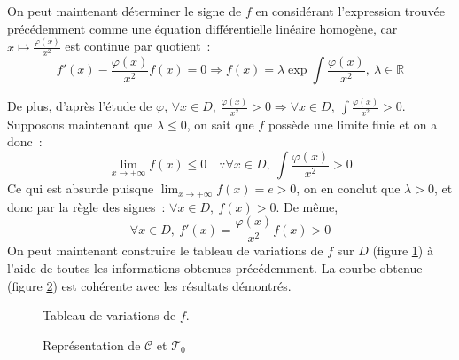 \documentclass{article}
\begin{document}
    On peut maintenant déterminer le signe de $f$ en considérant l'expression trouvée précédemment comme une équation différentielle linéaire homogène, car $x\mapsto\frac{\varphi(x)}{x^2}$ est continue par quotient~:
    \begin{displaymath}
      f'(x) - \frac{\varphi(x)}{x^2}f(x) = 0 \Rightarrow f(x) = \lambda\exp\int\frac{\varphi(x)}{x^2},\ \lambda\in\mathbb{R}
    \end{displaymath}

    De plus, d'après l'étude de $\varphi$, $\forall x\in D,\ \frac{\varphi(x)}{x^2} > 0 \Rightarrow \forall x\in D,\ \int\frac{\varphi(x)}{x^2} > 0$. Supposons maintenant que $\lambda \leqslant 0$, on sait que $f$ possède une limite finie et on a donc~:
    \begin{displaymath}
      \lim_{x\to +\infty} f(x) \leqslant 0 \quad\because\forall x\in D,\ \int\frac{\varphi(x)}{x^2} > 0
    \end{displaymath}
    Ce qui est absurde puisque $\lim_{x\to +\infty} f(x) = e > 0$, on en conclut que $\lambda > 0$, et donc par la règle des signes~: $\forall x\in D,\ f(x) > 0$. De même,
    \begin{displaymath}
      \forall x\in D,\ f'(x) = \frac{\varphi(x)}{x^2}f(x) > 0
    \end{displaymath}
    On peut maintenant construire le tableau de variations de $f$ sur $D$ (figure \ref{varf}) à l'aide de toutes les informations obtenues précédemment. La courbe obtenue (figure \ref{C}) est cohérente avec les résultats démontrés.


    \begin{figure}[h]
     \begin{center}
     \end{center}
     \caption{Tableau de variations de $f$.}
     \label{varf}
    \end{figure}

    \begin{figure}[ht]
      \begin{center}
      \end{center}
      \caption{Représentation de $\mathscr{C}$ et $\mathscr{T}_0$}
      \label{C}
    \end{figure}
\end{document}
